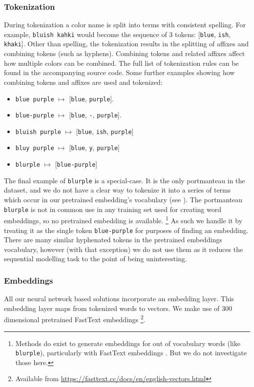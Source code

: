 \documentclass[]{book}
\newcommand{\parencite}{\citep}
\newcommand{\natlang}[1]{\texttt{#1}}
\begin{document}
\subsubsection{Tokenization}
During tokenization a color name is split into terms with consistent spelling.
For example, \natlang{bluish kahki} would become the sequence of 3 tokens: [\natlang{blue}, \natlang{ish}, \natlang{khaki}].
Other than spelling, the tokenization results in the splitting of affixes and combining tokens (such as hyphens).
Combining tokens and related affixes affect how multiple colors can be combined.
The full list of tokenization rules can be found in the accompanying source code.
Some further examples showing how combining tokens and affixes are used and tokenized:
\begin{itemize}
	\item \natlang{blue purple} $\mapsto$ [\natlang{blue}, \natlang{purple}].
	\item \natlang{blue-purple} $\mapsto$ [\natlang{blue}, \natlang{-}, \natlang{purple}].
	\item \natlang{bluish purple} $\mapsto$ [\natlang{blue}, \natlang{ish}, \natlang{purple}]
	\item \natlang{bluy purple} $\mapsto$ [\natlang{blue}, \natlang{y}, \natlang{purple}]
	\item \natlang{blurple} $\mapsto$ [\natlang{blue-purple}]
\end{itemize}
The final example of \natlang{blurple} is a special-case.
It is the only portmanteau in the dataset, and we do not have a clear way to tokenize it into a series of terms which occur in our pretrained embedding's vocabulary (see ).
The portmanteau \natlang{blurple} is not in common use in any training set used for creating word embeddings, so no pretrained embedding is available.%
\footnote{Methods do exist to generate embeddings for out of vocabulary words (like \natlang{blurple}), particularly with FastText embeddings \parencite{bojanowski2016enriching}. But we do not investigate those here.}
As such we handle it by treating it as the single token \natlang{blue-purple} for purposes of finding an embedding.
There are many similar hyphenated tokens in the pretrained embeddings vocabulary, however (with that exception) we do not use them as it reduces the sequential modelling task to the point of being uninteresting.

\subsubsection{Embeddings}\label{sec:embeddings} 
All our neural network based solutions incorporate an embedding layer.
This embedding layer maps from tokenized words to vectors.
We make use of 300 dimensional pretrained FastText embeddings \parencite{bojanowski2016enriching}\footnote{Available from \url{https://fasttext.cc/docs/en/english-vectors.html}}.
\end{document}
